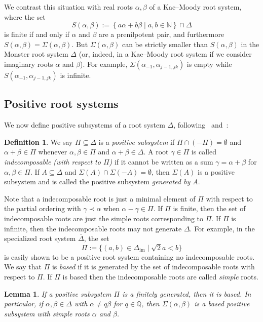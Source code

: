 \documentclass[11pt,letterpaper]{amsart}
\newcounter{thecounter}
\numberwithin{thecounter}{section}
\newtheorem{lemma}[thecounter]{Lemma}
\theoremstyle{definition}
\newtheorem{defn}[thecounter]{Definition}
\DeclareMathOperator{\im}{{im}}
\renewcommand{\a}{\alpha}
\renewcommand{\b}{\beta}
\newcommand{\g}{\gamma}
\newcommand{\N}{{\mathbb N}}
\newcommand{\Q}{{\mathbb Q}}
\begin{document}
We contrast this situation with real roots $\a,\b$ of a Kac--Moody root system, where the set 
$$S(\a,\b):=\left\{a\a+b\b \mid a,b\in\N \right\}\cap\Delta$$ is finite if and only if $\a$ and $\b$ are a prenilpotent pair,
and furthermore $S(\a,\b)=\Sigma(\a,\b)$.
But $\Sigma(\a,\b)$ can be strictly smaller 
than $S(\a,\b)$ in the Monster root system $\Delta$
(or, indeed, in a Kac--Moody root system if we consider imaginary roots $\a$ and $\b$).
For example, $\Sigma\left(\a_{-1},\a_{j-1,jk} \right)$ is empty while $S(\a_{-1},\a_{j-1,jk})$ is infinite. 



\subsection{Positive root systems}\label{SS-pos}
We now define positive subsystems of a root system $\Delta$, following~\cite{morita80} and~\cite{loosneher11}:
\begin{defn}
We say $\Pi\subseteq\Delta$ is a \emph{positive subsystem} if $\Pi\cap(-\Pi)=\emptyset$ and
$\a+\b\in\Pi$ whenever $\a,\b\in\Pi$ and $\a+\b\in\Delta$.
A root $\g\in\Pi$ is called \emph{indecomposable (with respect to $\Pi$)} if it cannot be written as a 
sum $\g=\a+\b$ for $\a,\b\in\Pi$.
If $A\subseteq \Delta$ and $\Sigma(A)\cap\Sigma(-A)=\emptyset$, then $\Sigma(A)$ is a positive subsystem and is called
the positive subsystem \emph{generated by $A$}.
\end{defn}

Note that a indecomposable root is just a minimal element of $\Pi$ with respect to the 
partial ordering with $\g\prec\a$ when $\a-\g\in \Pi$. 
If $\Pi$ is finite, then the set of indecomposable roots are just the simple roots corresponding to $\Pi$.
If $\Pi$ is infinite, then the indecomposable roots may not generate $\Delta$.
For example, in the specialized root system $\overline{\Delta}$, the set
$$ \Pi := \{ (a,b)\in \Delta_{\im} \mid \sqrt{2}a<b\}$$
is easily shown to be a positive root system containing no indecomposable roots.
We say that $\Pi$ is \emph{based} if it is generated by the set of indecomposable roots with respect to $\Pi$.
If $\Pi$ is based then the indecomposable roots are called \emph{simple} roots.

\begin{lemma}
If a positive subsystem $\Pi$ is a finitely generated, then it is based.
In particular, if $\a,\b\in\Delta$ with $\a\ne q\b$ for $q\in\Q$,
then $\Sigma(\a,\b)$ is a based positive subsystem with simple roots $\a$ and $\b$.
\end{lemma}
\end{document}
